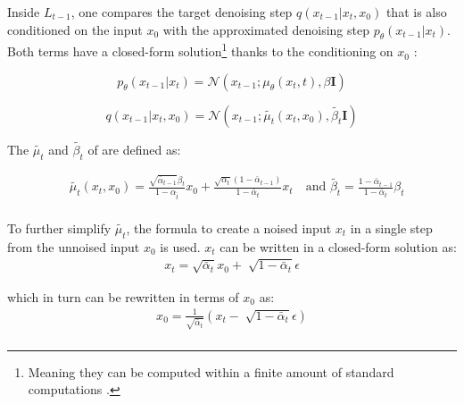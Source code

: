 Inside $L_{t-1}$, one compares the target denoising step $q(x_{t-1}|x_t,x_0)$ that is also conditioned on the input $x_0$ with the approximated denoising step $p_\theta(x_{t-1}|x_t)$. %
Both terms have a closed-form solution\footnote{Meaning they can be computed within a finite amount of standard computations \cite{borwein2013ClosedFormsWhat}.} thanks to the conditioning on $x_0$ \cite{ho2020DenoisingDiffusionProbabilistic}:

\begin{equation}
  \label{eqn:lt-1_1}
  p_\theta(x_{t-1}|x_t)= \mathcal{N}(x_{t-1};\mu_\theta(x_t,t), \beta\textbf{I})
\end{equation}

\begin{equation}
  \label{eqn:lt-1_2}
q(x_{t-1}|x_t,x_0) = \mathcal{N}(x_{t-1};\tilde{\mu_t}(x_t,x_0), \tilde{\beta_t}\textbf{I})
\end{equation}

\noindent The $\tilde{\mu_t}$ and $\tilde{\beta_t}$ of  are defined as:

\begin{equation}
  \begin{align}
    \label{eqn:lt-1_21}
    &\tilde{\mu_t}(x_t, x_0) = \frac{\sqrt{\bar{\alpha}_{t-1}}\beta_t}{1 - \alpha_{\bar{t}}}x_0 +   \frac{\sqrt{\alpha_t}(1-\bar{\alpha}_{t-1})}{1 - \bar{\alpha}_{t}}x_t \quad \textrm{and }
    \tilde{\beta_t} =\frac{1-\bar{\alpha}_{t-1}}{1-\bar{\alpha}_t}\beta_t \\
  \end{align}
\end{equation}

\noindent To further simplify $\tilde{\mu_t}$, the formula to create a noised input $x_t$ in a single step from the unnoised input $x_0$ is used.
$x_t$ can be written in a closed-form solution as:
\begin{equation}
  \begin{align}
    \label{eqn:lt-1_22}
    x_t = \sqrt{\bar{\alpha}_{t}}x_0+\sqrt[]{1-\bar{\alpha}_t}\epsilon
  \end{align}
\end{equation}

\noindent which in turn can be rewritten in terms of $x_0$ as:
\begin{equation}
  \begin{align}
    \label{eqn:lt-1_23}
    x_0 = \frac{1}{\sqrt{\bar{\alpha}_t}}(x_t-\sqrt[]{1-\bar{\alpha}_t}\epsilon) \\
  \end{align}
\end{equation}

